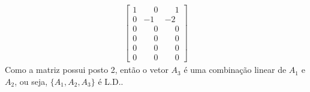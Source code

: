\begin{exemplo}
\begin{enumerate}[label={\arabic*})]
\begin{solucao}
\begin{align*}
     				\left[
     					\begin{array}{ccc}
		  					1 & \phantom{-}0 & \phantom{-}1\\
							0 & -1 & -2\\
							0 & \phantom{-}0 & \phantom{-}0\\
							0 & \phantom{-}0 & \phantom{-}0\\
							0 & \phantom{-}0 & \phantom{-}0\\
							0 & \phantom{-}0 & \phantom{-}0
     					\end{array}
     				\right]
     		\end{align*}
     		Como a matriz possui posto 2, ent\~ao o vetor $A_3$ \'e uma combina\c{c}\~ao linear de $A_1$ e $A_2$, ou seja, $\{A_1, A_2, A_3\}$ \'e L.D..
		\end{solucao}
	\end{enumerate}
\end{exemplo}
